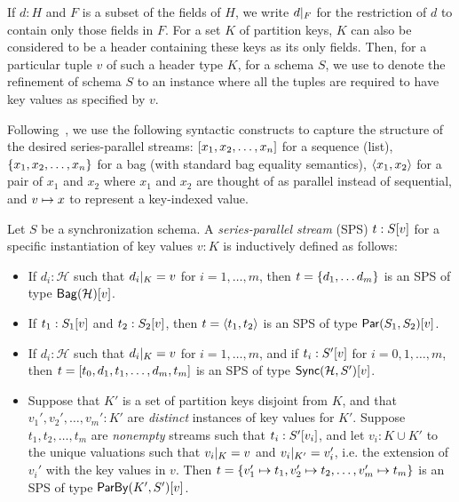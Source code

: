 If $d : H$ and $F$ is a subset of the fields of $H$, we write $\tuprestrict{d}{F}$ for
the restriction of $d$ to contain only those fields in $F$.
For a set $K$ of partition keys, $K$ can also be considered to be a header containing these keys as its only fields.
Then, for a particular tuple $v$ of such a header type $K$, for a schema $S$, we use
 to denote the refinement of schema $S$ to an instance where all the tuples
are required to have key values as specified by $v$.

Following~, we use the following syntactic constructs to capture the structure of the desired series-parallel streams: $\spsseq{x_1, x_2, \ldots, x_n}$ for
a sequence (list), $\spsbag{x_1, x_2, \ldots, x_n}$ for a bag (with standard bag
equality semantics), $\spspargen{x_1, x_2}$ for a pair of $x_1$ and $x_2$ where
$x_1$ and $x_2$ are thought of as parallel instead of sequential,
and $\keyed{v}{x}$ to represent a key-indexed value.

\begin{definition}
\label{45:def:trace}
Let $S$ be a synchronization schema.
A \emph{series-parallel stream} (SPS) $t : \spstype{v}{S}$ for a specific instantiation of key values $v : K$ is inductively defined as follows:
\begin{itemize}
\item
If $d_i : \mathcal{H}$ such that $\tuprestrict{d_i}{K} = v$
for $i = 1, \ldots, m$,
then $t = \spsbag{d_1, \ldots d_m}$
is an SPS of type $\spstype{v}{\relleaf{\mathcal{H}}}$.
\item
If $t_1 : \spstype{v}{S_1}$
and $t_2 : \spstype{v}{S_2}$,
then $t = \spspar{t_1}{t_2}$
is an SPS of type $\spstype{v}{\parcomp{S_1}{S_2}}$.
\item
If $d_i : \mathcal{H}$ such that $\tuprestrict{d_i}{K} = v$
for $i = 1, \ldots, m$,
and if $t_i: \spstype{v}{S'}$ for $i = 0, 1, \ldots, m$,
then
$t = \spsseq{t_0, d_1, t_1, \ldots, d_m, t_m}$
is an SPS of type $\spstype{v}{\hier{\mathcal{H}}{S'}}$.
\item
Suppose that $K'$ is a set of partition keys disjoint from $K$,
and that $v_1', v_2', \ldots, v_m': K'$ are \emph{distinct} instances
of key values for $K'$.
Suppose $t_1, t_2, \ldots, t_m$ are \emph{nonempty} streams such that
$t_i: \spstype{v_i}{S'}$,
and let $v_i: K \cup K'$ to the unique valuations
such that $\tuprestrict{v_i}{K} = v$ and $\tuprestrict{v_i}{K'} = v_i'$,
i.e. the extension of $v_i'$ with the key values in $v$.
Then
$t = \spsbag{\keyed{v_1'}{t_1}, \keyed{v_2'}{t_2}, \ldots, \keyed{v_m'}{t_m}}$
is an SPS of type
$\spstype{v}{\keyby{K'}{S'}}$.
\end{itemize}
\end{definition}


